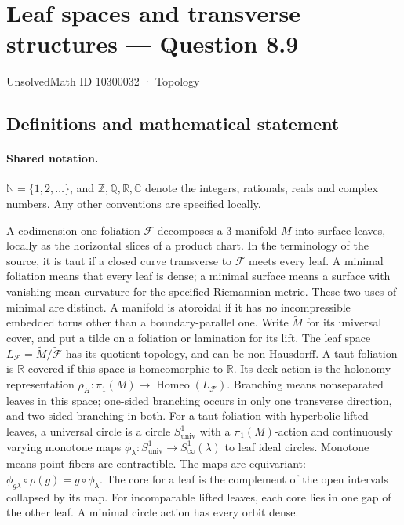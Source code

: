 \documentclass[11pt]{article}
\begin{document}
\setcounter{section}{10300031}
\section{Leaf spaces and transverse structures — Question 8.9}\label{10300032}
{\small\sffamily UnsolvedMath ID 10300032 · Topology}
\subsection{Definitions and mathematical statement}

\paragraph{Shared notation.}$\mathbb N=\{1,2,\ldots\}$, and $\mathbb Z,\mathbb Q,\mathbb R,\mathbb C$ denote the integers, rationals, reals and complex numbers. Any other conventions are specified locally.


A codimension-one foliation $\mathcal F$ decomposes a $3$-manifold $M$ into surface leaves, locally as the horizontal slices of a product chart. In the terminology of the source, it is taut if a closed curve transverse to $\mathcal F$ meets every leaf. A minimal foliation means that every leaf is dense; a minimal surface means a surface with vanishing mean curvature for the specified Riemannian metric. These two uses of minimal are distinct. A manifold is atoroidal if it has no incompressible embedded torus other than a boundary-parallel one. Write $\widetilde M$ for its universal cover, and put a tilde on a foliation or lamination for its lift. The leaf space $L_{\mathcal F}=\widetilde M/\widetilde{\mathcal F}$ has its quotient topology, and can be non-Hausdorff. A taut foliation is $\mathbb R$-covered if this space is homeomorphic to $\mathbb R$. Its deck action is the holonomy representation $\rho_H:\pi_1(M)\longrightarrow\operatorname{Homeo}(L_{\mathcal F})$. Branching means nonseparated leaves in this space; one-sided branching occurs in only one transverse direction, and two-sided branching in both. For a taut foliation with hyperbolic lifted leaves, a universal circle is a circle $S^1_{\mathrm{univ}}$ with a $\pi_1(M)$-action and continuously varying monotone maps $\phi_\lambda:S^1_{\mathrm{univ}}\to S^1_\infty(\lambda)$ to leaf ideal circles. Monotone means point fibers are contractible. The maps are equivariant: $\phi_{g\lambda}\circ\rho(g)=g\circ\phi_\lambda$. The core for a leaf is the complement of the open intervals collapsed by its map. For incomparable lifted leaves, each core lies in one gap of the other leaf. A minimal circle action has every orbit dense.
\end{document}
